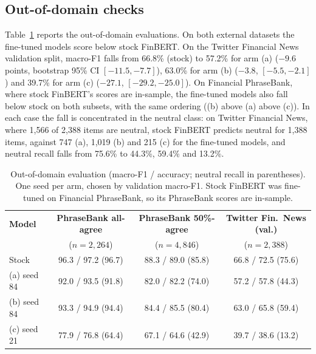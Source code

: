 \documentclass{aims}
\numberwithin{equation}{section}
\begin{document}
\subsection{Out-of-domain checks}
Table~\ref{tab:ood} reports the out-of-domain evaluations. On both external datasets
the fine-tuned models score below stock FinBERT. On the Twitter Financial News
validation split, macro-F1 falls from 66.8\% (stock) to 57.2\% for arm (a)
($-9.6$ points, bootstrap 95\% CI $[-11.5, -7.7]$), 63.0\% for arm (b) ($-3.8$,
$[-5.5, -2.1]$) and 39.7\% for arm (c) ($-27.1$, $[-29.2, -25.0]$). On Financial
PhraseBank, where stock FinBERT's scores are in-sample, the fine-tuned models also
fall below stock on both subsets, with the same ordering ((b) above (a) above (c)).
In each case the fall is concentrated in the neutral class: on Twitter Financial
News, where 1{,}566 of 2{,}388 items are neutral, stock FinBERT predicts neutral for
1{,}388 items, against 747 (a), 1{,}019 (b) and 215 (c) for the fine-tuned models,
and neutral recall falls from 75.6\% to 44.3\%, 59.4\% and 13.2\%.

\begin{table}[ht]
\centering
\caption{Out-of-domain evaluation (macro-F1 / accuracy; neutral recall in
parentheses). One seed per arm, chosen by validation macro-F1. Stock FinBERT was
fine-tuned on Financial PhraseBank, so its PhraseBank scores are in-sample.}
\label{tab:ood}
\small
\begin{tabular}{lccc}
\toprule
\textbf{Model} & \textbf{PhraseBank all-agree} & \textbf{PhraseBank 50\%-agree} & \textbf{Twitter Fin.\ News (val.)} \\
 & ($n = 2{,}264$) & ($n = 4{,}846$) & ($n = 2{,}388$) \\
\midrule
Stock & 96.3 / 97.2 (96.7) & 88.3 / 89.0 (85.8) & 66.8 / 72.5 (75.6) \\
(a) seed 84 & 92.0 / 93.5 (91.8) & 82.0 / 82.2 (74.0) & 57.2 / 57.8 (44.3) \\
(b) seed 84 & 93.3 / 94.9 (94.4) & 84.4 / 85.5 (80.4) & 63.0 / 65.8 (59.4) \\
(c) seed 21 & 77.9 / 76.8 (64.4) & 67.1 / 64.6 (42.9) & 39.7 / 38.6 (13.2) \\
\bottomrule
\end{tabular}
\end{table}
\end{document}
